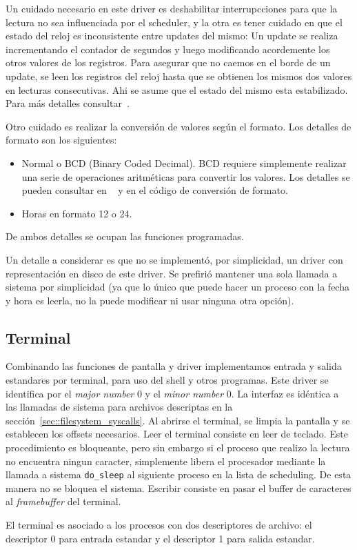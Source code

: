 Un cuidado necesario en este driver es deshabilitar interrupcciones para que la lectura no sea influenciada por el scheduler, y la otra
es tener cuidado en que el estado del reloj es inconsistente entre updates del mismo: Un update se realiza incrementando el contador de
segundos y luego modificando acordemente los otros valores de los registros. Para asegurar que no caemos en el borde de un update, se
leen los registros del reloj hasta que se obtienen los mismos dos valores en lecturas consecutivas. Ahi se asume que el estado del mismo
esta estabilizado. Para m\'as detalles consultar~\cite{osdev}.

Otro cuidado es realizar la conversi\'on de valores seg\'un el formato. Los detalles de formato son los siguientes:

\begin{itemize}
	\item Normal o BCD (Binary Coded Decimal). BCD requiere simplemente realizar una serie de operaciones aritm\'eticas para convertir
	los valores. Los detalles se pueden consultar en ~\cite{osdev} y en el c\'odigo de conversi\'on de formato.
	\item Horas en formato 12 o 24.
\end{itemize}     

De ambos detalles se ocupan las funciones programadas.

Un detalle a considerar es que no se implement\'o, por simplicidad, un driver con representaci\'on en disco de este driver. Se prefiri\'o
mantener una sola llamada a sistema por simplicidad (ya que lo \'unico que puede hacer un proceso con la fecha y hora es leerla, no la puede
modificar ni usar ninguna otra opci\'on).

\subsection{Terminal}
\label{sec::tty}

Combinando las funciones de pantalla y driver implementamos entrada y salida estandares por terminal, para uso del shell y otros programas.
Este driver se identifica por el \textit{major number} 0 y el \textit{minor number} 0. La interfaz es id\'entica a las llamadas de sistema
para archivos descriptas en la secci\'on~\ref{sec::filesystem_syscalls}. Al abrirse el terminal, se limpia la pantalla y se establecen los offsets
necesarios. Leer el terminal consiste en leer de teclado. Este procedimiento es bloqueante, pero sin embargo si el proceso que realizo la lectura
no encuentra ningun caracter, simplemente libera el procesador mediante la llamada a sistema \texttt{do\_sleep} al siguiente proceso en la lista
de scheduling. De esta manera no se bloquea el sistema. Escribir consiste en pasar el buffer de caracteres al \textit{framebuffer} del terminal.

El terminal es asociado a los procesos con dos descriptores de archivo: el descriptor 0 para entrada estandar y el descriptor 1 para salida
estandar.

